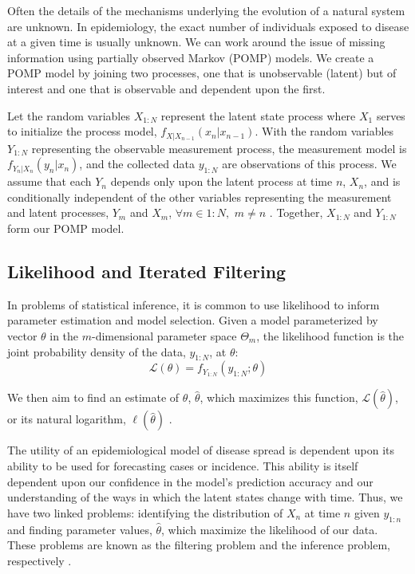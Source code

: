\documentclass[12pt]{article}
\begin{document}
 Often the details of the mechanisms underlying the evolution of a natural system are unknown. In epidemiology, the exact number of individuals exposed to disease at a given time is usually unknown. We can work around the issue of missing information using partially observed Markov (POMP) models. We create a POMP model by joining two processes, one that is unobservable (latent) but of interest and one that is observable and dependent upon the first.
  
  Let the random variables $X_{1:N}$ represent the latent state process where $X_1$ serves to initialize the process model, $f_{X|X_{n-1}}(x_n|x_{n-1})$. With the random variables $Y_{1:N}$ representing the observable measurement process, the measurement model is $f_{Y_n|X_n}(y_n|x_n)$, and the collected data $y_{1:N}$ are observations of this process. We assume that each $Y_n$ depends only upon the latent process at time $n$, $X_n$, and is conditionally independent of the other variables representing the measurement and latent processes, $Y_m$ and $X_m$, \hspace{1mm} $\forall m \in 1:N,$ \hspace{1mm} $m \ne n$ \cite{Shumway_ch6}. Together, $X_{1:N}$ and $Y_{1:N}$ form our POMP model.

\subsection{Likelihood and Iterated Filtering}
\label{sec:like}

 In problems of statistical inference, it is common to use likelihood to inform parameter estimation and model selection. Given a model parameterized by vector $\theta$ in the $m$-dimensional parameter space $\Theta_m$, the likelihood function is the joint probability density of the data, $y_{1:N}$, at $\theta$:
        \begin{equation}
        \mathcal{L}(\theta) = f_{Y_{1:N}}(y_{1:N}; \theta)
        \end{equation}
        
  We then aim to find an estimate of $\theta$, $\hat{\theta}$, which maximizes this function, $\mathcal{L}(\hat{\theta})$, or its natural logarithm, $\mathbf{\ell}(\hat{\theta})$ \cite{Millar}. 
  
  The utility of an epidemiological model of disease spread is dependent upon its ability to be used for forecasting cases or incidence. This ability is itself dependent upon our confidence in the model's prediction accuracy and our understanding of the ways in which the latent states change with time. Thus, we have two linked problems: identifying the distribution of $X_{n}$ at time $n$ given $y_{1:n}$ and finding parameter values, $\hat{\theta}$, which maximize the likelihood of our data. These problems are known as the filtering problem and the inference problem, respectively \cite{crisan, Millar}.
  
\end{document}
